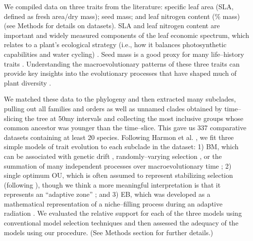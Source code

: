 \documentclass[a4paper,12pt]{article}
\begin{document}
We compiled data on three traits from the literature: specific leaf area (SLA, defined as fresh area/dry mass); seed mass; and leaf nitrogen content (\% mass) (see Methods for details on datasets). SLA and leaf nitrogen content are important and widely measured components of the leaf economic spectrum, which relates to a plant's ecological strategy (i.e., how it balances photosynthetic capabilities and water cycling) \citep{Wright2004}. Seed mass is a good proxy for many life--history traits \citep{Westoby2002, Moles2005}. Understanding the macroevolutionary patterns of these three traits can provide key insights into the evolutionary processes that have shaped much of plant diversity \citep{ksi}.  

We matched these data to the phylogeny and then extracted many subclades, pulling out all families and orders as well as unnamed clades obtained by time--slicing the tree at 50my intervals and collecting the most inclusive groups whose common ancestor was younger than the time--slice. This gave us 337 comparative datasets containing at least 20 species.
Following Harmon et al. \citep{Harmon2010}, we fit three simple models of trait evolution to each subclade in the dataset: 1) BM, which can be associated with genetic drift \citep{Lande1976, Felsenstein1988, Lynch1990, HansenMartins1996}, randomly--varying selection \citep{Felsenstein1973}, or the summation of many independent processes over macroevolutionary time \citep{HansenMartins1996, Uyeda2011, PennellPE}; 2) single optimum OU, which is often assumed to represent stabilizing selection (following \citep{Lande1976}), though we think a more meaningful interpretation is that it represents an ``adaptive zone'' \citep{Hansen2012book, PennellHarmon}; and 3) EB, which was developed as a mathematical representation of a niche--filling process during an adaptive radiation \citep{Blomberg2003, Harmon2010, SlaterPennell}. We evaluated the relative support for each of the three models using conventional model selection techniques and then assessed the adequacy of the models using our procedure. (See Methods section for further details.) 
\end{document}
